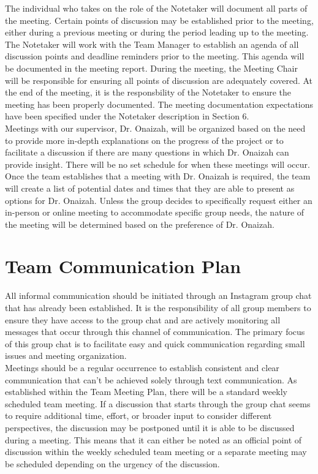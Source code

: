 \documentclass{article}
\begin{document}
The individual who takes on the role of the Notetaker will document all parts of the meeting. Certain points of
discussion may be established prior to the meeting, either during a previous meeting or during the period leading
up to the meeting. The Notetaker will work with the Team Manager to establish an agenda of all discussion points
and deadline reminders prior to the meeting. This agenda will be documented in the meeting report. During the
meeting, the Meeting Chair will be responsible for ensuring all points of discussion are adequately covered. At the
end of the meeting, it is the responsbility of the Notetaker to ensure the meeting has been properly documented.
The meeting documentation expectations have been specified under the Notetaker description in Section 6.\\

Meetings with our supervisor, Dr. Onaizah, will be organized based on the need to provide more in-depth explanations
on the progress of the project or to facilitate a discussion if there are many questions in which Dr. Onaizah can
provide insight. There will be no set schedule for when these meetings will occur. Once the team establishes that a
meeting with Dr. Onaizah is required, the team will create a list of potential dates and times that they are able
to present as options for Dr. Onaizah. Unless the group decides to specifically request either an in-person or
online meeting to accommodate specific group needs, the nature of the meeting will be determined based on the
preference of Dr. Onaizah.

\section{Team Communication Plan}

\iffalse
\wss{Issues on GitHub should be part of your communication plan.}
\fi

All informal communication should be initiated through an Instagram group chat that has already been established. It
is the responsibility of all group members to ensure they have access to the group chat and are actively monitoring
all messages that occur through this channel of communication. The primary focus of this group chat is to facilitate
easy and quick communication regarding small issues and meeting organization.\\

Meetings should be a regular occurrence to establish consistent and clear communication that can’t be achieved
solely through text communication. As established within the Team Meeting Plan, there will be a standard weekly scheduled
team meeting. If a discussion that starts through the group chat seems to require additional time, effort, or
broader input to consider different perspectives, the discussion may be postponed until it is able to be discussed
during a meeting. This means that it can either be noted as an official point of discussion within the weekly
scheduled team meeting or a separate meeting may be scheduled depending on the urgency of the discussion.\\
\end{document}

